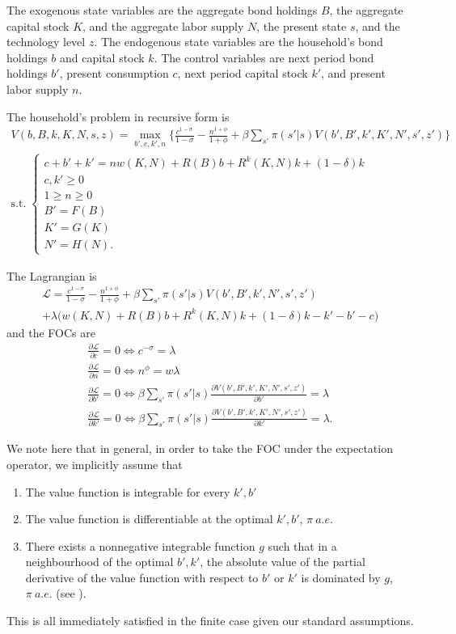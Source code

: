 \documentclass[dvipsnames,11pt]{article}
\begin{document}
\begin{enumerate}
            \begin{solution}
The exogenous state variables are the aggregate bond holdings $B$, the aggregate capital stock $K$, and the aggregate labor supply $N$, the present state $s$, and the technology level $z$. The endogenous state variables are the household's bond holdings $b$ and capital stock $k$. The control variables are next period bond holdings $b'$, present consumption $c$, next period capital stock $k'$, and present labor supply $n$.

The household's problem in recursive form is 
\begin{gather*}
    V(b,B,k,K,N,s,z) = \max_{b',c,k',n}\Bigg\{\frac{c^{1-\sigma}}{1-\sigma}-\frac{n^{1+\phi}}{1+\phi}+\beta\sum_{s'}\pi(s'|s)V(b',B',k',K',N',s',z')\Bigg\} \\ \mathrm{s.t.}\; \begin{cases}
        c+b'+k' = nw(K,N)+R(B)b+R^k(K,N)k+(1-\delta)k \\c,k' \ge 0 \\ 1 \ge n \ge 0 \\ B'=F(B) \\ K'=G(K) \\ N' = H(N).
    \end{cases}
\end{gather*}

The Lagrangian is 
\begin{gather*}
    \mathcal{L}= \frac{c^{1-\sigma}}{1-\sigma}-\frac{n^{1+\phi}}{1+\phi}+\beta\sum_{s'}\pi(s'|s)V(b',B',k',N',s',z')\\+\lambda\Big(w(K,N)+R(B)b+R^k(K,N)k+(1-\delta)k-k'-b'-c\Big)
\end{gather*}
and the FOCs are 
\begin{gather*}
    \frac{\partial\mathcal{L}}{\partial c}=0 \iff c^{-\sigma} = \lambda \\ \frac{\partial\mathcal{L}}{\partial n} = 0 \iff n^\phi=w\lambda \\ \frac{\partial\mathcal{L}}{\partial b'}=0 \iff \beta \sum_{s'}\pi(s'|s)\frac{\partial V(b',B',k',K',N',s',z')}{\partial b'}=\lambda \\ \frac{\partial\mathcal{L}}{\partial k'}=0 \iff \beta \sum_{s'}\pi(s'|s)\frac{\partial V(b',B',k',K',N',s',z')}{\partial k'}=\lambda.
\end{gather*}

We note here that in general, in order to take the FOC under the expectation operator, we implicitly assume that 
\begin{enumerate}
    \item The value function is integrable for every $k',b'$
    \item The value function is differentiable at the optimal $k',b'$, $\pi \: a.e.$
    \item There exists a nonnegative integrable function $g$ such that in a neighbourhood of the optimal $b',k'$, the absolute value of the partial derivative of the value function with respect to $b'$ or $k'$ is dominated by $g$, $\pi \: a.e.$ (see \cite{gall2022measure}).
\end{enumerate} 
This is all immediately satisfied in the finite case given our standard assumptions.


\end{solution}
\end{enumerate}
\end{document}
